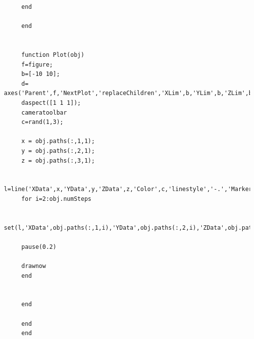 \documentclass{article}
\begin{document}
\begin{lstlisting}
	 end
	 
	 end
	 
	 
	 function Plot(obj)
	 f=figure;
	 b=[-10 10];
	 d= axes('Parent',f,'NextPlot','replaceChildren','XLim',b,'YLim',b,'ZLim',b);
	 daspect([1 1 1]);
	 cameratoolbar
	 c=rand(1,3);
	 
	 x = obj.paths(:,1,1);
	 y = obj.paths(:,2,1);
	 z = obj.paths(:,3,1);
	 
	 l=line('XData',x,'YData',y,'ZData',z,'Color',c,'linestyle','-.','Marker','o','markersize',10,'Parent',d);
	 for i=2:obj.numSteps
	 
	 set(l,'XData',obj.paths(:,1,i),'YData',obj.paths(:,2,i),'ZData',obj.paths(:,3,i));
	 
	 pause(0.2)
	 
	 drawnow
	 end
	 
	 
	 end
	 
	 end
	 end
	 \end{lstlisting}
	 
\end{document}
